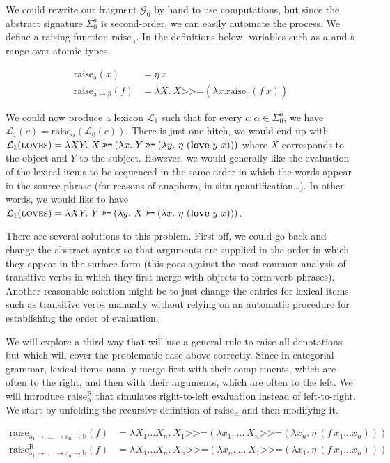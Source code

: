 \documentclass{article}
\newcommand{\hsbind}{\mathbin{\texttt{>>=}}}
\newcommand{\abs}[1]{\textsc{#1}}
\newcommand{\obj}[1]{\textbf{#1}}
\begin{document}
We could rewrite our fragment $\mathcal{G}_0$ by hand to use computations,
but since the abstract signature $\Sigma^a_0$ is second-order, we can
easily automate the process. We define a raising function
$\mathrm{raise_\alpha}$. In the definitions below, variables such as
$a$ and $b$ range over atomic types.

\begin{align*}
  \mathrm{raise_a}(x) &= \eta\ x \\
  \mathrm{raise_{a \to \beta}}(f) &= \lambda X.\ X \hsbind (\lambda
  x. \mathrm{raise_\beta}(f\ x))
\end{align*}

We could now produce a lexicon $\mathcal{L}_1$ such that for every $c :
\alpha \in \Sigma^a_0$, we have $\mathcal{L}_1(c) =
\mathrm{raise_\alpha}(\mathcal{L}_0(c))$. There is just one hitch, we
would end up with $\mathcal{L}_1(\abs{loves}) = \lambda X Y.\ X \hsbind
(\lambda x.\ Y \hsbind (\lambda y.\ \eta\ (\obj{love}\ y\ x)))$ where $X$
corresponds to the object and $Y$ to the subject. However, we would
generally like the evaluation of the lexical items to be sequenced in the
same order in which the words appear in the source phrase (for reasons of
anaphora, in-situ quantification\ldots). In other words, we would like to
have $\mathcal{L}_1(\abs{loves}) = \lambda X Y.\ Y \hsbind (\lambda y.\ X
\hsbind (\lambda x.\ \eta\ (\obj{love}\ y\ x)))$.

There are several solutions to this problem. First off, we could go back
and change the abstract syntax so that arguments are supplied in the order
in which they appear in the surface form (this goes against the most common
analysis of transitive verbs in which they first merge with objects to form
verb phrases). Another reasonable solution might be to just change the
entries for lexical items such as transitive verbs manually without relying
on an automatic procedure for establishing the order of evaluation.

We will explore a third way that will use a general rule to raise all
denotations but which will cover the problematic case above
correctly. Since in categorial grammar, lexical items usually merge first
with their complements, which are often to the right, and then with their
arguments, which are often to the left. We will introduce
$\mathrm{raise^R_\alpha}$ that simulates right-to-left evaluation
instead of left-to-right. We start by unfolding the recursive definition of
$\mathrm{raise_\alpha}$ and then modifying it.

\begin{align*}
  \mathrm{raise_{a_1 \to\ \ldots\ \to a_n \to b}}(f) &= \lambda X_1 \ldots X_n.\ X_1 \hsbind (\lambda x_1.\ \ldots\ X_n \hsbind (\lambda x_n.\ \eta\ (f\ x_1 \ldots x_n))) \\
  \mathrm{raise^R_{a_1 \to\ \ldots\ \to a_n \to b}}(f) &= \lambda X_1 \ldots X_n.\ X_n \hsbind (\lambda x_n.\ \ldots\ X_1 \hsbind (\lambda x_1.\ \eta\ (f\ x_1 \ldots x_n))) \\
\end{align*}
\end{document}
